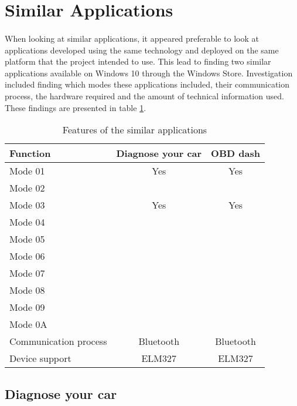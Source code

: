 \section{Similar Applications}
	\paragraph{}{
	When looking at similar applications, it appeared preferable to look at applications developed using the same technology and deployed on the same platform that the project intended to use. This lead to finding two similar applications available on Windows 10 through the Windows Store. Investigation included finding which modes these applications included, their communication process, the hardware required and the amount of technical information used. These findings are presented in table \ref{tab:Features}.
	}
	
	\begin{table}[h]
		\begin{center}				
			\begin{tabular}{| l | c | c |}
			\hline
			\textbf{Function} & \textbf{Diagnose your car}  &\textbf{OBD dash}\\
			\hline
			Mode 01 & Yes & Yes\\
			\hline
			Mode 02 & &\\
			\hline
			Mode 03 & Yes & Yes\\
			\hline
			Mode 04 & &\\
			\hline
			Mode 05 & &\\
			\hline
			Mode 06 & &\\
			\hline
			Mode 07 & &\\
			\hline
			Mode 08 & &\\
			\hline
			Mode 09 & &\\
			\hline
			Mode 0A & &\\
			\hline
			Communication process & Bluetooth & Bluetooth\\
			\hline
			Device support & ELM327 & ELM327\\
			\hline			
			\end{tabular}
			\caption{Features of the similar applications}
			\label{tab:Features}
		\end{center}
	\end{table}
	
	\subsection{Diagnose your car}
